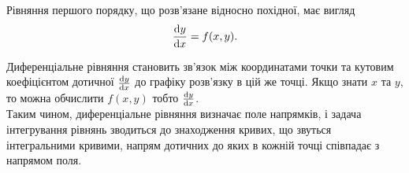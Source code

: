 Рівняння першого порядку, що розв’язане відносно похідної, має вигляд
\begin{equation*}
	\frac{\mathop{}\!\mathrm{d} y}{\mathop{}\!\mathrm{d} x} = f(x, y).	
\end{equation*}

Диференціальне рівняння становить зв’язок між координатами точки та кутовим коефіцієнтом дотичної $\frac{\mathop{}\!\mathrm{d} y}{\mathop{}\!\mathrm{d} x}$ до графіку розв’язку в цій же точці. Якщо знати $x$ та $y$, то можна обчислити $f(x, y)$ тобто $\frac{\mathop{}\!\mathrm{d} y}{\mathop{}\!\mathrm{d} x}$. \\

Таким чином, диференціальне рівняння визначає поле напрямків, і задача інтегрування рівнянь зводиться до знаходження кривих, що звуться інтегральними кривими, напрям дотичних до яких в кожній точці співпадає з напрямом поля.
